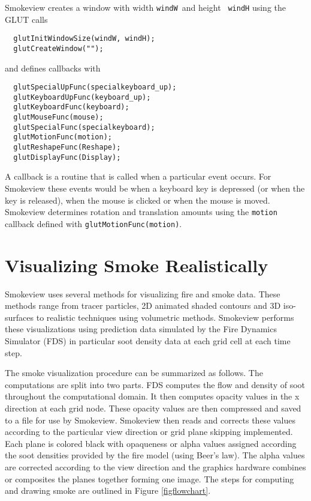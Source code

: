 Smokeview creates a window with width {\tt windW}\ and height {\tt
windH} using the GLUT calls

\begin{verbatim}
  glutInitWindowSize(windW, windH);
  glutCreateWindow("");
\end{verbatim}

and defines callbacks with

\begin{verbatim}
  glutSpecialUpFunc(specialkeyboard_up);
  glutKeyboardUpFunc(keyboard_up);
  glutKeyboardFunc(keyboard);
  glutMouseFunc(mouse);
  glutSpecialFunc(specialkeyboard);
  glutMotionFunc(motion);
  glutReshapeFunc(Reshape);
  glutDisplayFunc(Display);
\end{verbatim}

A callback is a routine that is called when a particular event
occurs.  For Smokeview these events would be when a keyboard key
is depressed (or when the key is released), when the mouse is
clicked or when the mouse is moved.  Smokeview determines rotation
and translation amounts using the {\tt motion} callback defined
with {\tt glutMotionFunc(motion)}.

%
%
\section{Visualizing Smoke Realistically}

Smokeview uses several methods for visualizing fire and smoke
data.  These methods range from tracer particles, 2D animated
shaded contours and 3D iso-surfaces to realistic techniques using
volumetric methods. Smokeview performs these visualizations using
prediction data simulated by the Fire Dynamics Simulator (FDS) in
particular soot density data at each grid cell at each time step.

The smoke visualization procedure can be summarized as follows.
The computations are split into two parts. FDS computes the flow
and density of soot throughout the computational domain.  It then
computes opacity values in the x direction at each grid node.
These opacity values are then compressed and saved to a file for
use by Smokeview. Smokeview then reads and corrects these values
according to the particular view direction or grid plane skipping
implemented. Each plane is colored black with opaqueness or alpha
values assigned according the soot densities provided by the fire
model (using Beer's law). The alpha values are corrected according
to the view direction and the graphics hardware combines or
composites the planes together forming one image. The steps for
computing and drawing smoke are outlined in Figure
\ref{figflowchart}.

